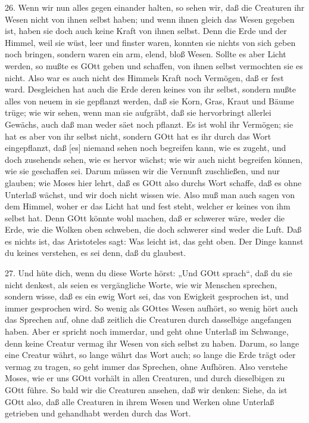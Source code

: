 26. Wenn wir nun alles gegen einander halten, so sehen wir, daß die Creaturen ihr Wesen nicht von ihnen selbst haben; und wenn ihnen gleich das Wesen gegeben ist, haben sie doch auch keine Kraft von ihnen selbst. Denn die Erde und der Himmel, weil sie wüst, leer und finster waren, konnten sie nichts von sich geben noch bringen, sondern waren ein arm, elend, bloß Wesen. Sollte es aber Licht werden, so mußte es GOtt geben und schaffen, von ihnen selbst vermochten sie es nicht. Also war es auch nicht des Himmels Kraft noch Vermögen, daß er fest ward. Desgleichen hat auch die Erde deren keines von ihr selbst, sondern mußte alles von neuem in sie gepflanzt werden, daß sie Korn, Gras, Kraut und Bäume trüge; wie wir sehen, wenn man sie aufgräbt, daß sie hervorbringt allerlei Gewächs, auch daß man weder säet noch pflanzt. Es ist wohl ihr Vermögen; sie hat es aber von ihr selbst nicht, sondern GOtt hat es ihr durch das Wort eingepflanzt, daß [es] niemand sehen noch begreifen kann, wie es zugeht, und doch zusehends sehen, wie es hervor wächst; wie wir auch nicht begreifen können, wie sie geschaffen sei. Darum müssen wir die Vernunft zuschließen, und nur glauben; wie Moses hier lehrt, daß es GOtt also durchs Wort schaffe, daß es ohne Unterlaß wächst, und wir doch nicht wissen wie. Also muß man auch sagen von dem Himmel, woher er das Licht hat und fest steht, welcher er keines von ihm selbst hat. Denn GOtt könnte wohl machen, daß er schwerer wäre, weder die Erde, wie die Wolken oben schweben, die doch schwerer sind weder die Luft. Daß es nichts ist, das Aristoteles sagt: Was leicht ist, das geht oben. Der Dinge kannst du keines verstehen, es sei denn, daß du glaubest.

27. Und hüte dich, wenn du diese Worte hörst: „Und GOtt sprach“, daß du sie nicht denkest, als seien es vergängliche Worte, wie wir Menschen sprechen, sondern wisse, daß es ein ewig Wort sei, das von Ewigkeit gesprochen ist, und immer gesprochen wird. So wenig als GOttes Wesen aufhört, so wenig hört auch das Sprechen auf, ohne daß zeitlich die Creaturen durch dasselbige angefangen haben. Aber er spricht noch immerdar, und geht ohne Unterlaß im Schwange, denn keine Creatur vermag ihr Wesen von sich selbst zu haben. Darum, so lange eine Creatur währt,
so lange währt das Wort auch; so lange die Erde trägt oder vermag zu tragen, so geht immer das Sprechen, ohne Aufhören. Also verstehe Moses, wie er uns GOtt vorhält in allen Creaturen, und durch dieselbigen zu GOtt führe. So bald wir die Creaturen ansehen, daß wir denken: Siehe, da ist GOtt also, daß alle Creaturen in ihrem Wesen und Werken ohne Unterlaß getrieben und gehandhabt werden durch das Wort.

